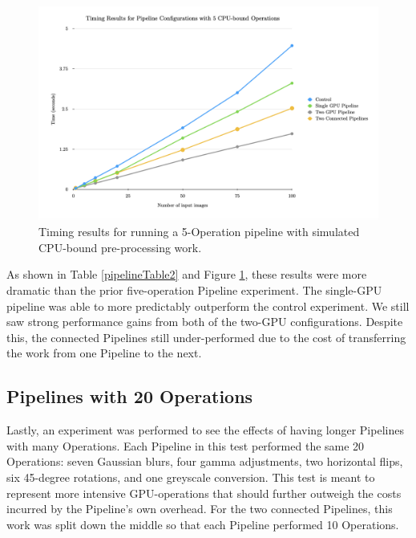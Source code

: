 \begin{figure}[H]
\includegraphics[width=\textwidth]{figures/pipelineChart3.png}
\centering
\caption{Timing results for running a 5-Operation pipeline with simulated CPU-bound pre-processing work.}
\label{pipelineChart2}
\end{figure}

As shown in Table \ref{pipelineTable2} and Figure \ref{pipelineChart2}, these results were more dramatic than the prior five-operation Pipeline experiment. The single-GPU pipeline was able to more predictably outperform the control experiment. We still saw strong performance gains from both of the two-GPU configurations. Despite this, the connected Pipelines still under-performed due to the cost of transferring the work from one Pipeline to the next.

\subsection{Pipelines with 20 Operations}

Lastly, an experiment was performed to see the effects of having longer Pipelines with many Operations. Each Pipeline in this test performed the same 20 Operations: seven Gaussian blurs, four gamma adjustments, two horizontal flips, six 45-degree rotations, and one greyscale conversion. This test is meant to represent more intensive GPU-operations that should further outweigh the costs incurred by the Pipeline's own overhead. For the two connected Pipelines, this work was split down the middle so that each Pipeline performed 10 Operations. 

